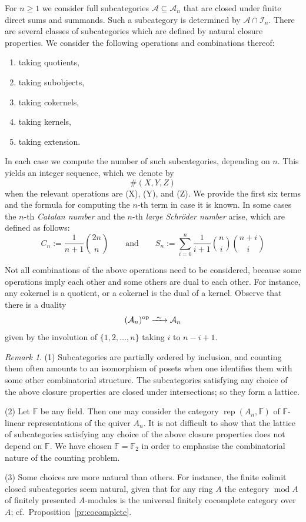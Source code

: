 \documentclass[a4paper]{amsart}
\theoremstyle{plain}
\theoremstyle{definition}
\theoremstyle{remark}
\newtheorem{rem}[thm]{Remark}
\numberwithin{equation}{section}
\renewcommand{\mod}{\operatorname{mod}}
\newcommand{\rep}{\operatorname{rep}}
\newcommand{\op}{\mathrm{op}}
\newcommand{\longiso}{\xrightarrow{\ \raisebox{-.4ex}[0ex][0ex]{$\scriptstyle{\sim}$}\ }}
\def\A{\mathcal A}
\def\I{\mathcal I}
\def\bbF{\mathbb F}
\begin{document}
For $n\ge 1$ we consider full subcategories $\A\subseteq\A_n$ that are
closed under finite direct sums and summands. Such  a subcategory is
determined by $\A\cap\I_n$. There are  several classes of
subcategories which are defined by natural closure
properties. We consider the following operations and combinations thereof:
\begin{enumerate}
\item[(Q)] taking quotients,
\item[(S)] taking subobjects,
\item[(C)] taking cokernels,
\item[(K)] taking kernels,
\item[(E)] taking extension.
\end{enumerate}
In each case we compute the number of such
subcategories, depending on $n$. This yields an integer
sequence, which we denote by \[\#(X,Y,Z)\] when
the relevant operations are  (X), (Y), and (Z).
We provide the first six terms and the formula for
computing the $n$-th term in case it is known. In some cases
the $n$-th \emph{Catalan number} and
the $n$-th \emph{large Schröder number} arise, which are defined as follows:
\[C_n := \frac{1}{n+1}\binom{2n}{n}\qquad\text{and}\qquad S_n :=
  \sum_{i=0}^n\frac{1}{i+1}\binom{n}{i}\binom{n+i}{i}\]

Not all combinations of the above operations need to be considered,
because some operations imply each other and some others are dual to
each other. For instance, any cokernel is a quotient, or a cokernel is
the dual of a kernel. Observe that there is a duality
\begin{equation}\label{eq:dual}
  (\A_n)^\op\longiso\A_n
\end{equation}  given by the involution of $\{1,2,\ldots,n\}$
taking $i$ to $n-i+1$.

\begin{rem}
  (1) Subcategories are partially ordered by inclusion, and counting
  them often amounts to an isomorphism of posets when one identifies
  them with some other combinatorial structure. The subcategories
  satisfying any choice of the above closure properties are closed under
  intersections; so they form a lattice.

  (2)  Let $\bbF$ be any field. Then one may consider the category
  $\rep(A_n,\bbF)$ of $\bbF$-linear representations of the quiver
  $A_n$.  It is not difficult to show that the lattice of subcategories
 satisfying any choice of the above closure properties does not depend on
  $\bbF$. We have chosen $\bbF=\bbF_2$ in order to emphasise the
  combinatorial nature of the counting problem.

  (3) Some choices are more natural than others. For instance, the
  finite colimit closed subcategories seem natural, given that
  for any ring $A$ the category $\mod A$ of finitely presented $A$-modules
  is the universal finitely cocomplete category over $A$; cf.\
  Proposition~\ref{pr:cocomplete}.
\end{rem}
\end{document}
